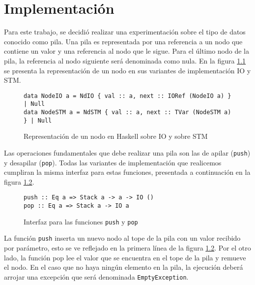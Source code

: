 \chapter{Implementación}\label{ch:implementacion}
Para este trabajo, se decidió realizar una experimentación sobre el tipo de datos conocido como pila. Una pila es representada por una referencia a un nodo que contiene un valor y una referencia al nodo que le sigue. Para el último nodo de la pila, la referencia al nodo siguiente será denominada como nula. En la figura \ref{fig:node-rep} se presenta la representación de un nodo en sus variantes de implementación IO y STM.

\begin{figure}[H]
  \centering
  \begin{verbatim}
data NodeIO a = NdIO { val :: a, next :: IORef (NodeIO a) } | Null
data NodeSTM a = NdSTM { val :: a, next :: TVar (NodeSTM a) } | Null
  \end{verbatim}
  \caption{Representación de un nodo en Haskell sobre IO y sobre STM}
  \label{fig:node-rep}
\end{figure}

Las operaciones fundamentales que debe realizar una pila son las de apilar (\texttt{push}) y desapilar (\texttt{pop}). Todas las variantes de implementación que realicemos cumpliran la misma interfaz para estas funciones, presentada a continuación en la figura \ref{fig:interfazStack}.

\begin{figure}[H]
  \centering
  \begin{verbatim}
push :: Eq a => Stack a -> a -> IO ()
pop :: Eq a => Stack a -> IO a
  \end{verbatim}
  \caption{Interfaz para las funciones \texttt{push} y \texttt{pop}}
  \label{fig:interfazStack}
\end{figure}

La función \texttt{push} inserta un nuevo nodo al tope de la pila con un valor recibido por parámetro, esto se ve reflejado en la primera línea de la figura \ref{fig:interfazStack}. Por el otro lado, la función pop lee el valor que se encuentra en el tope de la pila y remueve el nodo. En el caso que no haya ningún elemento en la pila, la ejecución deberá arrojar una excepción que será denominada \texttt{EmptyException}.

